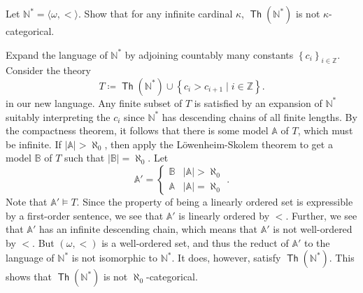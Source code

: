 \documentclass[10pt,letterpaper,cm]{nupset}
\theoremstyle{definition}
\theoremstyle{theorem}
\theoremstyle{remark}
\newcommand{\A}{\mathbb A}
\newcommand{\N}{\mathbb N}
\newcommand{\Z}{\mathbb Z}
\newcommand{\B}{\mathbb{B}}
\newcommand{\1}{\mathbb{1}}
\newcommand{\0}{\vec 0}
\DeclareMathOperator{\thh}{\mathsf{Th}}
\begin{document}
\begin{problem}[3.]
Let $\N^{\ast} = \langle \omega, <\rangle$. Show that for any infinite cardinal $\kappa$, $\thh(\N^{\ast})$ is not $\kappa$-categorical.
\end{problem}
\begin{solution}
Expand the language of $\N^{\ast}$ by adjoining countably many constants $\left\{c_i\right\}_{i\in \Z}$. Consider the theory
\[ \label{eqn:st1}
T \coloneqq \thh(\N^{\ast}) \cup \left\{ c_i > c_{i+1} \mid i\in \Z \right\}. \tag{$\star$}
\] in our new language.  Any finite subset of $T$ is satisfied by an expansion of $\N^{\ast}$ suitably interpreting the $c_i$ since $\N^{\ast}$ has descending chains of all finite lengths. By the compactness theorem, it follows that there is some model $\A$ of $T$, which must be infinite. If $\left\lvert{\A}\right\rvert >\aleph_0$, then apply the L\"owenheim-Skolem theorem to get a model $\B$ of $T$ such that $\left\lvert{\B}\right\rvert = \aleph_0$.  Let 
\[
\A' = \begin{cases} \B & \left\lvert{\A}\right\rvert >\aleph_0
\\ \A & \left\lvert{\A}\right\rvert =\aleph_0
\end{cases}.
\] Note that $\A' \models T$. Since the property of being a linearly ordered set is expressible by a first-order sentence, we see that $\A'$ is linearly ordered by $<$. Further, we see that $\A'$ has an infinite descending chain, which means that $\A'$ is not well-ordered by $<$.  But $\left(\omega, <\right)$ is a well-ordered set, and thus the reduct of $\A'$ to the language of $\N^{\ast}$ is not isomorphic to $\N^{\ast}$. It does, however, satisfy $\thh(\N^{\ast})$. This shows that $\thh(\N^{\ast})$ is not $\aleph_0$-categorical.

\medskip


\end{solution}
\end{document}
